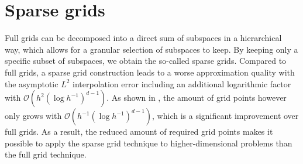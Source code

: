 \documentclass[
  a4paper,  %
  twoside,  %
  bibliography=totoc,
  headsepline,
  cleardoublepage=empty,
  parskip=half,
  draft=false
]{scrbook}
\begin{document}
\section{Sparse grids}

Full grids can be decomposed into a direct sum of subspaces in a hierarchical way, which allows for a granular selection of subspaces to keep.
By keeping only a specific subset of subspaces, we obtain the so-called sparse grids.
Compared to full grids, a sparse grid construction leads to a worse approximation quality with the asymptotic $L^2$ interpolation error including an additional logarithmic factor with $\mathcal{O}(h^2 (\log h^{-1})^{d-1})$.
As shown in \cite{Bungartz2004}, the amount of grid points however only grows with $\mathcal{O}(h^{-1} (\log h^{-1})^{d-1})$, which is a significant improvement over full grids.
As a result, the reduced amount of required grid points makes it possible to apply the sparse grid technique to higher-dimensional problems than the full grid technique.
\end{document}
